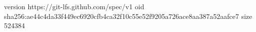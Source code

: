 version https://git-lfs.github.com/spec/v1
oid sha256:ae44c4da33f449ec6920cfb4ca32f10c55e52f9205a726ace8aa387a52aafce7
size 524384
